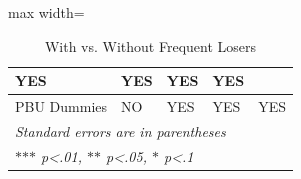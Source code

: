 \begin{table}[H]
\begin{adjustbox}{max width=\textwidth}
\begin{tabular}{p{3.92cm}p{2.57cm}p{2.5cm}p{2.5cm}p{2.5cm}}
{YES} &
\multicolumn{1}{|p{3.02cm}}{\centering
YES} &
\multicolumn{1}{|p{3.02cm}}{\centering
YES} &
\multicolumn{1}{|p{3.02cm}|}{\centering
YES} \\
\hline
\multicolumn{1}{|p{5.3cm}}{PBU Dummies} &
\multicolumn{1}{|p{3.14cm}}{\centering
NO} &
\multicolumn{1}{|p{3.02cm}}{\centering
YES} &
\multicolumn{1}{|p{3.02cm}}{\centering
YES} &
\multicolumn{1}{|p{3.02cm}|}{\centering
YES} \\
\hline
\multicolumn{5}{|p{17.49cm}|}{\textit{Standard errors are in parentheses}} \\
\hline
\multicolumn{5}{|p{17.49cm}|}{\textit{$\ast$$\ast$$\ast$ p<.01, $\ast$$\ast$ p<.05, $\ast$ p<.1}} \\
\hline
\end{tabular}
\end{adjustbox}
\caption{With vs. Without Frequent Losers}
\label{tab:vs_frequent_losers}\end{table}
\vspace{17\baselineskip}
